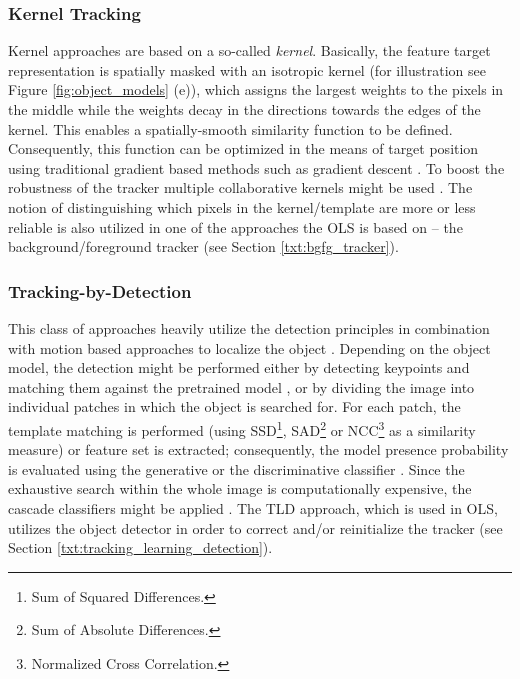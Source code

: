 \subsubsection*{Kernel Tracking}
Kernel approaches are based on a so-called \textit{kernel}. Basically, the feature target representation is spatially masked with an isotropic kernel (for illustration see Figure \ref{fig:object_models} (e)), which assigns the largest weights to the pixels in the middle while the weights decay in the directions towards the edges of the kernel. This enables a spatially-smooth similarity function to be defined. Consequently, this function can be optimized in the means of target position using traditional gradient based methods such as gradient descent \cite{Comaniciu:2003:KOT:776753.776799}. To boost the robustness of the tracker multiple collaborative kernels might be used \cite{MultipleCollaborativeKernelTracking, Multi-kernelCorrelationFilterForVisualTracking}. The notion of distinguishing which pixels in the kernel/template are more or less reliable is also utilized in one of the approaches the OLS is based on -- the background/foreground tracker (see Section \ref{txt:bgfg_tracker}).

\subsubsection*{Tracking-by-Detection}
This class of approaches heavily utilize the detection principles in combination with motion based approaches to localize the object \cite{eth_biwi_00633, Kalal:2012:TRA:2225045.2225082}. Depending on the object model, the detection might be performed either by detecting keypoints and matching them against the pretrained model \cite{FastKeypointRecognitionInTenLinesOfCode, DBLP:journals/corr/abs-1211-5829}, or by dividing the image into individual patches in which the object is searched for. For each patch, the template matching is performed \cite{AFastTemplateMatchingAlgorithm, ObjectTrackinginMonochromaticVideo} (using SSD\footnote{Sum of Squared Differences.}, SAD\footnote{Sum of Absolute Differences.} or NCC\footnote{Normalized Cross Correlation.} as a similarity measure) or feature set is extracted; consequently, the model presence probability is evaluated using the generative or the discriminative classifier \cite{EnhancedGaussianMixtureModels, EfficientScan-windowGPGPU}. Since the exhaustive search within the whole image is computationally expensive, the cascade classifiers might be applied \cite{violaJones, RobustObjectDetectionViaSoftCascade}. The TLD approach, which is used in OLS, utilizes the object detector in order to correct and/or reinitialize the tracker (see Section \ref{txt:tracking_learning_detection}).

